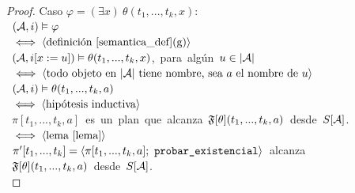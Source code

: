 \begin{proof}
\noindent Caso $\varphi = (\exists x)\ \theta(t_1,...,t_k,x):$\\
\mbox{\hspace{10mm} $(\mathcal{A}, i) \vDash \varphi$}\\
\mbox{\hspace{5mm} $\iff \langle \text{definición \ref{semantica_def}(g)} \rangle$}\\
\mbox{\hspace{10mm} $(\mathcal{A}, i[x:=u]) \vDash \theta(t_1,...,t_k,x)$, para algún $u\in|\mathcal{A}|$}\\
\mbox{\hspace{5mm} $\iff \langle \text{todo objeto en $|\mathcal{A}|$ tiene nombre, sea $a$
el nombre de $u$} \rangle$}\\
\mbox{\hspace{10mm} $(\mathcal{A}, i) \vDash \theta(t_1,...,t_k,a)$}\\
\mbox{\hspace{5mm} $\iff \langle \text{hipótesis inductiva} \rangle$}\\
\mbox{\hspace{10mm} $\pi[t_1,...,t_k,a]$ es un plan que alcanza
$\mathfrak{F}[\theta](t_1,...,t_k,a)$ desde $S[\mathcal{A}]$.}\\
\mbox{\hspace{5mm} $\iff \langle \text{lema \ref{lema}} \rangle$}\\
\mbox{\hspace{10mm} $\pi'[t_1,...,t_k] =
\tup{\pi[t_1,...,t_k,a];\ \texttt{probar\_existencial}}$ alcanza}\\
\mbox{\hspace{10mm} $\mathfrak{F}[\theta](t_1,...,t_k,a)$ desde $S[\mathcal{A}]$.}\\


\end{proof}
